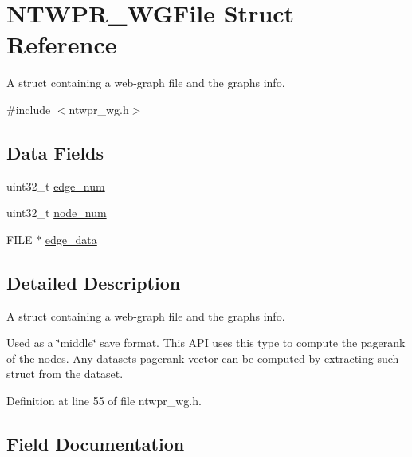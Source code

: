 \hypertarget{structNTWPR__WGFile}{}\section{N\+T\+W\+P\+R\+\_\+\+W\+G\+File Struct Reference}
\label{structNTWPR__WGFile}


A struct containing a web-\/graph file and the graphs info.  




{\ttfamily \#include $<$ntwpr\+\_\+wg.\+h$>$}

\subsection*{Data Fields}
\begin{DoxyCompactItemize}
\item 
uint32\+\_\+t \mbox{\hyperlink{structNTWPR__WGFile_a76b00f9ef8cd1938f7b9ece2db7c686d}{edge\+\_\+num}}
\item 
uint32\+\_\+t \mbox{\hyperlink{structNTWPR__WGFile_a473237730653419df2494e0f2f52995c}{node\+\_\+num}}
\item 
F\+I\+LE $\ast$ \mbox{\hyperlink{structNTWPR__WGFile_a00a45d3ce6764e40dcc382f3c5e3c8e9}{edge\+\_\+data}}
\end{DoxyCompactItemize}


\subsection{Detailed Description}
A struct containing a web-\/graph file and the graphs info. 

Used as a \char`\"{}middle\char`\"{} save format. This A\+PI uses this type to compute the pagerank of the nodes. Any dataset\textquotesingle{}s pagerank vector can be computed by extracting such struct from the dataset. 

Definition at line 55 of file ntwpr\+\_\+wg.\+h.



\subsection{Field Documentation}
\mbox{\label{structNTWPR__WGFile_a00a45d3ce6764e40dcc382f3c5e3c8e9}} 
